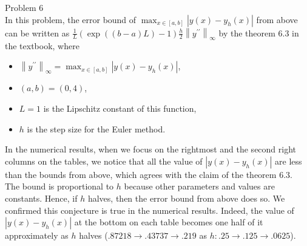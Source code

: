 \documentclass[dvipdfmx]{article}
\newcommand{\norm}[1]{\left\lVert#1\right\rVert}
\begin{document}
Problem 6\\
In this problem, the error bound of $\max_{x \in [a,b]}\left|y(x)-y_h(x)\right|$
from above can be written as 
$\frac{1}{L}\left(\exp\left((b-a)L\right) - 1\right) \frac{h}{2} \norm{y^{\prime\prime}}_{\infty}$ 
by the theorem $6.3$ in the textbook, 
where 
\begin{itemize}
  \item $\norm{y^{\prime\prime}}_{\infty} = \max_{x \in [a,b]}\left|y(x)-y_h(x)\right|$,
  \item $(a,b) = (0, 4)$,
  \item $L = 1$ is the Lipschitz constant of this function, 
  \item $h$ is the step size for the Euler method.
\end{itemize}

In the numerical results, when we focus on the rightmost and the second right columns on the tables, we notice that all the value of $\left|y(x)-y_h(x)\right|$ are less than the bounds from above, which agrees with the claim of the theorem $6.3$.\\
The bound is proportional to $h$ because other parameters and values are constants. Hence, if $h$ halves, then the error bound from above does so. We confirmed this conjecture is true in the numerical results. Indeed, the value of $\left|y(x)-y_h(x)\right|$ at the bottom on each table becomes one half of it approximately as $h$ halves ($.87218 \to .43737 \to .219$ as $h: .25 \to .125 \to .0625$).\\
\end{document}
